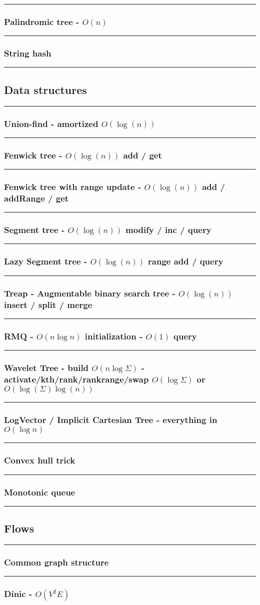 \documentclass[landscape,a4paper,twocolumn,10pt]{report}
\renewcommand{\line}{\noindent\rule{\linewidth}{1pt}}
\newcommand{\algosection}[1]{\line \subsection*{#1}}
\newcommand{\algorithm}[1]{\line \subsubsection*{#1}}
\begin{document}
\algorithm{Palindromic tree - $O(n)$}


\algorithm{String hash}


\algosection{Data structures}
\label{datastruct}

\algorithm{Union-find - amortized $O(\log(n))$}


\algorithm{Fenwick tree - $O(\log(n))$ add / get}


\algorithm{Fenwick tree with range update - $O(\log(n))$ add / addRange / get}


\algorithm{Segment tree - $O(\log(n))$ modify / inc / query}


\algorithm{Lazy Segment tree - $O(\log(n))$ range add / query}


\algorithm{Treap - Augmentable binary search tree - $O(\log(n))$ insert / split / merge}


%

\algorithm{RMQ - $O(n \log n)$ initialization - $O(1)$ query}


\algorithm{Wavelet Tree - build $O(n \log \Sigma)$ - activate/kth/rank/rankrange/swap $O(\log \Sigma)$ or $O(\log(\Sigma) \log(n))$}


\algorithm{LogVector / Implicit Cartesian Tree - everything in $O(\log n)$}


\algorithm{Convex hull trick}


\algorithm{Monotonic queue}


\algosection{Flows}
\label{flows}

\algorithm{Common graph structure}


\algorithm{Dinic - $O(V^2 E)$}


% 
\end{document}
